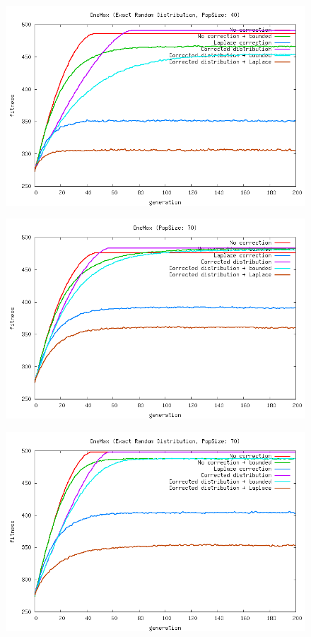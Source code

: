 \documentclass[a4paper,twoside]{report}
\begin{document}
\begin{figure}[htp]
\includegraphics[scale=0.5]{graph_onemax003_fitness.png}
\end{figure}
\begin{figure}[htp]
\includegraphics[scale=0.5]{graph_onemax004_fitness.png}
\end{figure}
\begin{figure}[htp]
\includegraphics[scale=0.5]{graph_onemax005_fitness.png}
\end{figure}
\end{document}
